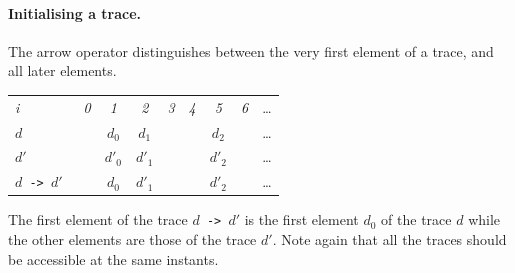 \paragraph{Initialising a trace.} The arrow operator distinguishes between the very first element of a trace, and all later elements.  
\begin{center}
  \leavevmode
  \begin{tabular}[]{l@{\quad}||@{\quad} cccccccc}
    \hline\hline
     \hbox{{\footnotesize \textit{i}}} &{\footnotesize \textit{0}}
     &{\footnotesize \textit{1}}&{\footnotesize \textit{2}}
     &{\footnotesize \textit{3}}&{\footnotesize \textit{4}}
     &{\footnotesize \textit{5}}&{\footnotesize \textit{6}}&\ldots
   \\  
    \hbox{$d$ \quad} &&$d_0$&$d_1$&&&$d_2$&&\ldots
   \\
    \hbox{$d'$} &&$d'_0$&$d'_1$&&&$d'_2$&&\ldots
   \\
   \hbox{\texttt{$d$ -> $d'$} } &&$d_0$&$d'_1$&&&$d'_2$&&\ldots
   \\
   \hline\hline
  \end{tabular}
\end{center}
The first element of the trace \texttt{$d$ -> $d'$} is the first element $d_{0}$ of the trace $d$ while the other elements are those of the trace $d'$. Note again that all the traces should be accessible at the same 
instants.

